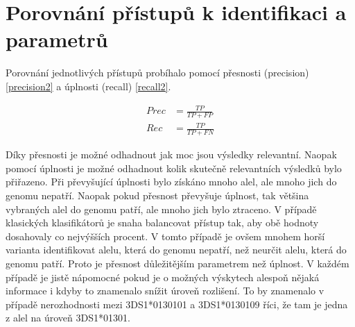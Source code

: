 \documentclass[czech,DP]{thesiskiv}
\numberwithin{equation}{section}
\begin{document}
\chapter{Porovnání přístupů k identifikaci a parametrů}
Porovnání jednotlivých přístupů probíhalo pomocí přesnosti (precision) \ref{precision2} a úplnosti (recall) \ref{recall2}. 

\begin{center}
	\begin{align}
   		\label{precision2} Prec &= \frac{TP}{TP + FP} \\[30pt]
   		\label{recall2} Rec &= \frac{TP}{TP + FN}
	\end{align}
\end{center}

\noindent
Díky přesnosti je možné odhadnout jak moc jsou výsledky relevantní. Naopak pomocí úplnosti je možné odhadnout kolik skutečně relevantních výsledků bylo přiřazeno. Při převyšující úplnosti bylo získáno mnoho alel, ale mnoho jich do genomu nepatří. Naopak pokud přesnost převyšuje úplnost, tak většina vybraných alel do genomu patří, ale mnoho jich bylo ztraceno. V případě klasických klasifikátorů je snaha balancovat přístup tak, aby obě hodnoty dosahovaly co nejvýšších procent. V tomto případě je ovšem mnohem horší varianta identifikovat alelu, která do genomu nepatří, než neurčit alelu, která do genomu patří. Proto je přesnost důležitějším parametrem než úplnost. V každém případě je jistě nápomocné pokud je o možných výskytech alespoň nějaká informace i kdyby to znamenalo snížit úroveň rozlišení. To by znamenalo v případě nerozhodnosti mezi 3DS1*0130101 a 3DS1*0130109 říci, že tam je jedna z alel na úroveň 3DS1*01301. 
\end{document}
